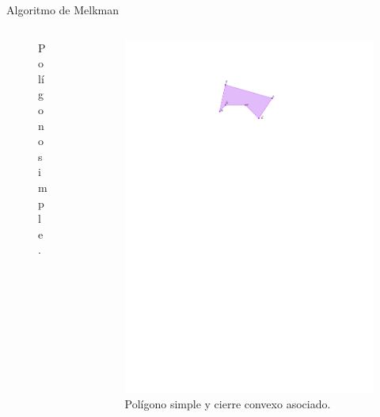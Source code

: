 \documentclass[aspectratio=169,xcolor=dvipsnames, t]{beamer}
\begin{document}
\begin{frame}{Algoritmo de Melkman}
\begin{columns}
\begin{column}{0.5\textwidth}
\begin{figure}
        \caption{Polígono simple.}
      \end{figure}
    \end{column}
    \begin{column}{0.5\textwidth}
      \begin{figure}
        \centering
        \includegraphics[width=\linewidth, height=0.5\textheight, page=2, keepaspectratio]{IPE/Melkman.pdf}
        \caption{Polígono simple y cierre convexo asociado.}
      \end{figure}
    \end{column}
  \end{columns}
\end{frame}
\end{document}
